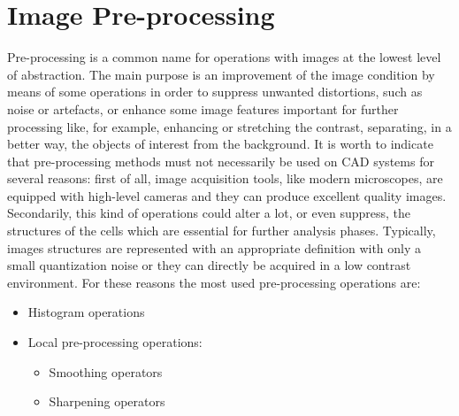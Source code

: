 \documentclass[final,a4paper,12pt,english]{UnicaPhdThesis3}
\begin{document}
\chapter{Image Pre-processing}
Pre-processing is a common name for operations with images at the lowest level of abstraction.
The main purpose is an improvement of the image condition by means of some operations in order to suppress unwanted distortions, such as noise or artefacts, or enhance some image features important for further processing like, for example, enhancing or stretching the contrast, separating, in a better way, the objects of interest from the background.
It is worth to indicate that pre-processing methods must not necessarily be used on CAD systems for several reasons: first of all, image acquisition tools, like modern microscopes, are equipped with high-level cameras and they can produce excellent quality images. Secondarily, this kind of operations could alter a lot, or even suppress, the structures of the cells which are essential for further analysis phases. Typically, images structures are represented with an appropriate definition with only a small quantization noise or they can directly be acquired in a low contrast environment. For these reasons the most used pre-processing operations are:
\begin{itemize}
\item Histogram operations
\item Local pre-processing operations:
\begin{itemize}
\item Smoothing operators
\item Sharpening operators
\end{itemize}
\end{itemize}
\end{document}
